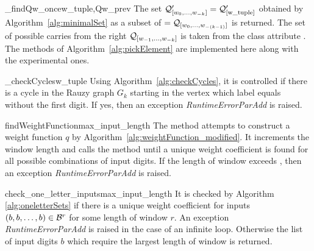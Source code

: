 \begin{method}{\_findQw\_once}{w\_tuple,Qw\_prev} 
The set $\mathcal{Q}_{[w_{0}, \dots, w_{-k}]}'=\mathcal{Q}'_{[\text{w\_tuple}]}$ obtained by Algorithm~\ref{alg:minimalSet} as a subset of $=\mathcal{Q}_{[w_{0}, \dots, w_{-(k-1)}]}$ is returned. The set of possible carries from the right $\mathcal{Q}_{[w_{-1}, \dots, w_{-k}]}$ is taken from the class attribute . The methods of Algorithm~\ref{alg:pickElement} are implemented here along with the experimental ones.
\end{method}

\begin{method}{\_checkCycles}{w\_tuple}
Using Algorithm~\ref{alg:checkCycles}, it is controlled if there is a cycle in the Rauzy graph $G_k$ starting in the vertex which label equals  without the first digit. If yes, then an exception \emph{RuntimeErrorParAdd} is raised. 
\end{method}


\begin{method}{findWeightFunction}{max\_input\_length}
The method attempts to construct a weight function $q$ by Algorithm~\ref{alg:weightFunction_modified}. It increments the window length and calls the method  until a unique weight coefficient is found for all possible combinations of input digits. If the length of window exceeds , then an exception \emph{RuntimeErrorParAdd} is raised. 
\end{method}


\begin{method}{check\_one\_letter\_inputs}{max\_input\_length}
It is checked by Algorithm \ref{alg:oneletterSets} if there is a unique weight coefficient for inputs $({b,b,\dots,b})\in\mathcal{B}^r$ for some length of window $r$. An exception \emph{RuntimeErrorParAdd} is raised in the case of an infinite loop. Otherwise the list of input digits  $b$ which require the largest length of window is returned.
\end{method}





